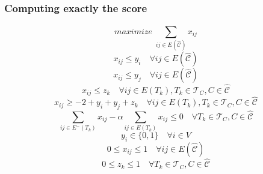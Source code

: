 \documentclass{beamer}
\begin{document}
\begin{frame}[c]
	\frametitle{Computing exactly the score}

	\begin{equation}
		maximize\; \sum^{}_{ij \in E(\hat{\mathcal{C}})} x _{ij}
	\end{equation}
	\begin{equation}
		x _{ij} \leq y_i \quad \forall ij \in E(\hat{\mathcal{C}})
	\end{equation}
	\begin{equation}
		x _{ij} \leq y_j \quad \forall ij \in E(\hat{\mathcal{C}})
	\end{equation}
	\begin{equation}
		x _{ij} \leq z_k \quad \forall ij \in E(T_k), T_k \in \mathcal{T} _{C}, C \in \hat{\mathcal{C} }
	\end{equation}
	\begin{equation}
		x _{ij} \geq - 2 + y_i + y_j + z_k \quad \forall ij \in E(T_k), T_k \in \mathcal{T} _{C}, C \in \hat{\mathcal{C} }
	\end{equation}
	\begin{equation}
		\sum^{}_{ij \in E^{-} (T_k)} x_{ij} - \alpha \sum^{}_{ij \in E(T_k)}
		x_{ij} \leq 0 \quad \forall T_{k} \in \mathcal{T} _{C}, C \in
		\hat{\mathcal{C}}
	\end{equation}
	\begin{equation}
		y _{i} \in  \{0, 1\} \quad \forall i \in V
	\end{equation}
	\begin{equation}
		0 \leq x _{ij} \leq 1 \quad \forall ij \in E(\hat{\mathcal{C}})
	\end{equation}
	\begin{equation}
		0 \leq z _{k} \leq 1 \quad \forall T_{k} \in \mathcal{T} _{C}, C \in
		\hat{\mathcal{C}}
	\end{equation}
\end{frame}
\end{document}

